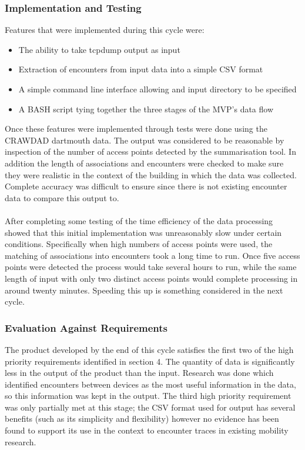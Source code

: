     \subsubsection{Implementation and Testing}
    Features that were implemented during this cycle were:
    \begin{itemize}
        \item The ability to take tcpdump output as input
        \item Extraction of encounters from input data into a simple CSV format 
        \item A simple command line interface allowing and input directory to be specified
        \item A BASH script tying together the three stages of the MVP's data flow
    \end{itemize}
    Once these features were implemented through tests were done using the CRAWDAD dartmouth data. The output was considered to be reasonable by inspection of the number of access points detected by the summarisation tool. In addition the length of associations and encounters were checked to make sure they were realistic in the context of the building in which the data was collected. Complete accuracy was difficult to ensure since there is not existing encounter data to compare this output to.\\\\
    After completing some testing of the time efficiency of the data processing showed that this initial implementation was unreasonably slow under certain conditions. Specifically when high numbers of access points were used, the matching of associations into encounters took a long time to run. Once five access points were detected the process would take several hours to run, while the same length of input with only two distinct access points would complete processing in around twenty minutes. Speeding this up is something considered in the next cycle.
    \subsubsection{Evaluation Against Requirements}
    The product developed by the end of this cycle satisfies the first two of the high priority requirements identified in section 4. The quantity of data is significantly less in the output of the product than the input. Research was done which identified encounters between devices as the most useful information in the data, so this information was kept in the output. The third high priority requirement was only partially met at this stage; the CSV format used for output has several benefits (such as its simplicity and flexibility) however no evidence has been found to support its use in the context to encounter traces in existing mobility research.   
